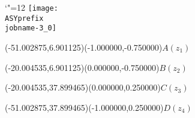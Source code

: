 \setlength{\unitlength}{1pt}%
\makeatletter%
\let\ASYencoding\f@encoding%
\let\ASYfamily\f@family%
\let\ASYseries\f@series%
\let\ASYshape\f@shape%
\makeatother%
{\catcode`"=12%
\texttt{[image: \\ASYprefix\\jobname-3\_0]}%
}%
%
\fontsize{6.000000}{7.200000}\selectfont%
\usefont{\ASYencoding}{\ASYfamily}{\ASYseries}{\ASYshape}%
\ASYalign(-51.002875,6.901125)(-1.000000,-0.750000){$A(z_1)$}%
%
\fontsize{6.000000}{7.200000}\selectfont%
\ASYalign(-20.004535,6.901125)(0.000000,-0.750000){$B(z_2)$}%
%
\fontsize{6.000000}{7.200000}\selectfont%
\ASYalign(-20.004535,37.899465)(0.000000,0.250000){$C(z_3)$}%
%
\fontsize{6.000000}{7.200000}\selectfont%
\ASYalign(-51.002875,37.899465)(-1.000000,0.250000){$D(z_4)$}%
